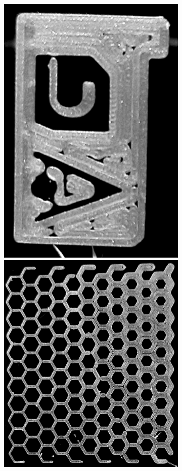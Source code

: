 \begin{figure}
\begin{subfigure}{\figwidth}
\includegraphics[height=\figheightTwo]{sources/applications/gMAT_center.png}
\includegraphics[height=\figheight]{sources/applications/P3_print_hex_center_edited.png}

\end{subfigure}
\end{figure}
